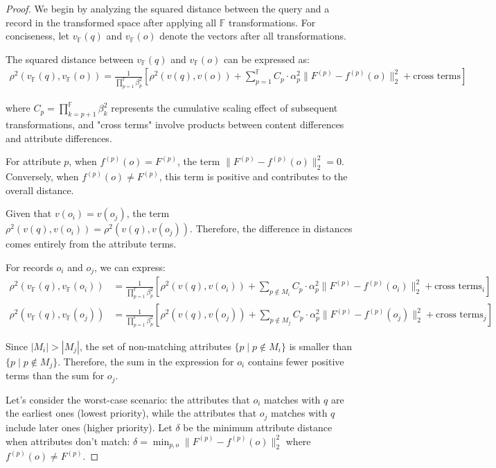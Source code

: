 \documentclass[numbers,sort]{article}
\begin{document}
\begin{proof}
We begin by analyzing the squared distance between the query and a record in the transformed space after applying all $\mathbb{F}$ transformations. For conciseness, let $v_{\mathbb{F}}(q)$ and $v_{\mathbb{F}}(o)$ denote the vectors after all transformations.

The squared distance between $v_{\mathbb{F}}(q)$ and $v_{\mathbb{F}}(o)$ can be expressed as:
\begin{align}
\rho^2(v_{\mathbb{F}}(q), v_{\mathbb{F}}(o)) = \frac{1}{\prod_{p=1}^{\mathbb{F}} \beta_p^2} \left[ \rho^2(v(q), v(o)) + \sum_{p=1}^{\mathbb{F}} C_p \cdot \alpha_p^2 \|F^{(p)} - f^{(p)}(o)\|_2^2 + \text{cross terms} \right]
\end{align}

where $C_p = \prod_{k=p+1}^{\mathbb{F}} \beta_k^2$ represents the cumulative scaling effect of subsequent transformations, and "cross terms" involve products between content differences and attribute differences.

For attribute $p$, when $f^{(p)}(o) = F^{(p)}$, the term $\|F^{(p)} - f^{(p)}(o)\|_2^2 = 0$. Conversely, when $f^{(p)}(o) \neq F^{(p)}$, this term is positive and contributes to the overall distance.

Given that $v(o_i) = v(o_j)$, the term $\rho^2(v(q), v(o_i)) = \rho^2(v(q), v(o_j))$. Therefore, the difference in distances comes entirely from the attribute terms.

For records $o_i$ and $o_j$, we can express:
\begin{align}
\rho^2(v_{\mathbb{F}}(q), v_{\mathbb{F}}(o_i)) &= \frac{1}{\prod_{p=1}^{\mathbb{F}} \beta_p^2} \left[ \rho^2(v(q), v(o_i)) + \sum_{p \notin M_i} C_p \cdot \alpha_p^2 \|F^{(p)} - f^{(p)}(o_i)\|_2^2 + \text{cross terms}_i \right] \\
\rho^2(v_{\mathbb{F}}(q), v_{\mathbb{F}}(o_j)) &= \frac{1}{\prod_{p=1}^{\mathbb{F}} \beta_p^2} \left[ \rho^2(v(q), v(o_j)) + \sum_{p \notin M_j} C_p \cdot \alpha_p^2 \|F^{(p)} - f^{(p)}(o_j)\|_2^2 + \text{cross terms}_j \right]
\end{align}

Since $|M_i| > |M_j|$, the set of non-matching attributes $\{p \mid p \notin M_i\}$ is smaller than $\{p \mid p \notin M_j\}$. Therefore, the sum in the expression for $o_i$ contains fewer positive terms than the sum for $o_j$.

Let's consider the worst-case scenario: the attributes that $o_i$ matches with $q$ are the earliest ones (lowest priority), while the attributes that $o_j$ matches with $q$ include later ones (higher priority). Let $\delta$ be the minimum attribute distance when attributes don't match: $\delta = \min_{p, o} \|F^{(p)} - f^{(p)}(o)\|_2^2$ where $f^{(p)}(o) \neq F^{(p)}$.


\end{proof}
\end{document}
